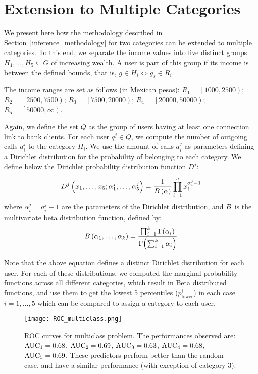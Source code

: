 \section{Extension to Multiple Categories}

We present here how the methodology described in Section~\ref{inference_methodology} for
two categories can be extended to multiple categories.
To this end, we separate the income values into five distinct groups $ H_1, \ldots, H_5 \subseteq G$ of increasing wealth. A user is part of this group if its income is between the defined bounds, that is, \( g \in H_i \iff g_s \in R_i \).

The income ranges are set as follows (in Mexican pesos):
	$R_1 = \left[1000, 2500\right) $;
	$R_2 = \left[2500, 7500\right) $;
	$R_3 = \left[7500, 20000\right) $;
	$R_4 = \left[20000, 50000\right) $;
	$R_5 = \left[50000, \infty\right) $.

Again, we define the set $Q$ as the group of users having at least one connection link to bank clients. For each user $q^j \in Q$, we compute the number of outgoing calls $a^j_i$ to the category $H_i$.
We use the amount of calls $a^j_i$  as parameters defining a Dirichlet distribution for the probability of belonging to each category.
We define below the Dirichlet probability distribution function $D^j$:
\begin{equation}
D^j \left( x_1, \ldots, x_5; \alpha^j_1, \ldots, \alpha^j_5 \right) = \frac{1}{B \left( \alpha \right)} \prod^5_{i = 1} x_i^{\alpha^j_i - 1}
\label{Dirichlet}
\end{equation}
where $\alpha^j_i = a^j_i +1$ are the parameters of the Dirichlet distribution, and $B$ is the multivariate beta distribution function, defined by: %
\begin{equation}
B \left( \alpha_1, \ldots, \alpha_k \right) = \frac{\prod^k_{i = 1} \Gamma \! \left( \alpha_i \right)}{\Gamma \! \left( \sum^k_{i = 1} \alpha_i \right) }
\label{Beta}
\end{equation}

Note that the above equation defines a distinct Dirichlet distribution for each user. For each of these distributions, we computed the marginal probability functions across all different categories, which result in Beta distributed functions, and use them to get the lowest 5 percentiles (\(p^i_{\operatorname{lower}}\)) in each case ${i=1, \ldots, 5}$ which can be compared to assign a category to each user.

\begin{figure}
\centering
\texttt{[image: ROC\_multiclass.png]}
\caption{ROC curves for multiclass problem. The performances observed are: $\operatorname{AUC}_1 = 0.68$, $\operatorname{AUC}_2 = 0.69$, $\operatorname{AUC}_3 = 0.63$, $\operatorname{AUC}_4 = 0.68$, $\operatorname{AUC}_5 = 0.69$. These predictors perform better than the random case, and have a similar performance (with exception of category 3).}
\label{roc_multiple_categories}
\end{figure}

